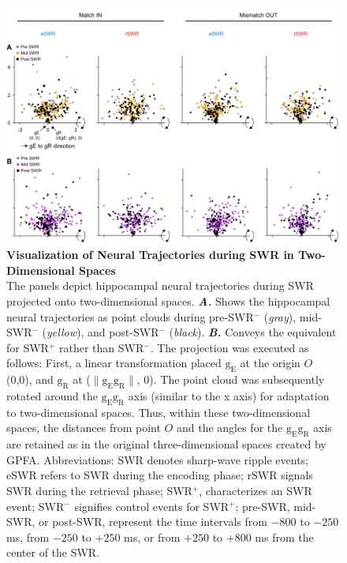 \documentclass[final,3p,times,twocolumn]{elsarticle}
\begin{document}
        \begin{figure}[ht]
        	\centering
            \includegraphics[width=1\textwidth]{./src/figures/.png/Figure_ID_06.png}
        	\caption{\textbf{
Visualization of Neural Trajectories during SWR in Two-Dimensional Spaces}
\smallskip
\\
The panels depict hippocampal neural trajectories during SWR projected onto two-dimensional spaces. \textbf{\textit{A.}} Shows the hippocampal neural trajectories as point clouds during pre-SWR$^-$ (\textit{gray}), mid-SWR$^-$ (\textit{yellow}), and post-SWR$^-$ (\textit{black}). \textbf{\textit{B.}} Conveys the equivalent for SWR$^+$ rather than SWR$^-$. The projection was executed as follows: First, a linear transformation placed $\mathrm{g_{E}}$ at the origin $O$ (0,0), and $\mathrm{g_{R}}$ at ($\lVert \mathrm{g_{E}g_{R}} \rVert$, 0). The point cloud was subsequently rotated around the $\mathrm{g_{E}g_{R}}$ axis (similar to the x axis) for adaptation to two-dimensional spaces. Thus, within these two-dimensional spaces, the distances from point $O$ and the angles for the $\mathrm{g_{E}g_{R}}$ axis are retained as in the original three-dimensional spaces created by GPFA. Abbreviations: SWR denotes sharp-wave ripple events; eSWR refers to SWR during the encoding phase; rSWR signals SWR during the retrieval phase; SWR$^+$, characterizes an SWR event; SWR$^-$ signifies control events for SWR$^+$; pre-SWR, mid-SWR, or post-SWR, represent the time intervals from $-800$ to $-250$ ms, from $-250$ to $+250$ ms, or from $+250$ to $+800$ ms from the center of the SWR.
}
        	\label{fig:06}
        \end{figure}
\end{document}
